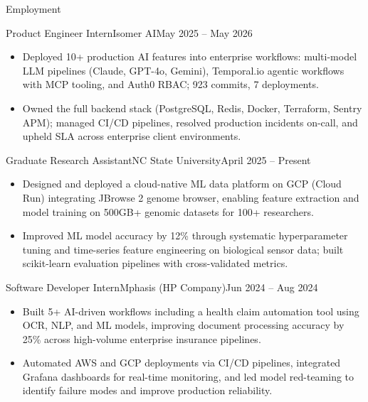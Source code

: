 \documentclass[]{mcdowellcv}
\begin{document}
\makeheader

\begin{cvsection}{Employment}
  \begin{cvsubsection}{Product Engineer Intern}{Isomer AI}{May 2025 -- May 2026}
    \begin{itemize}
      \item Deployed 10+ production AI features into enterprise workflows: multi-model LLM pipelines (Claude, GPT-4o, Gemini), Temporal.io agentic workflows with MCP tooling, and Auth0 RBAC; 923 commits, 7 deployments.
      \item Owned the full backend stack (PostgreSQL, Redis, Docker, Terraform, Sentry APM); managed CI/CD pipelines, resolved production incidents on-call, and upheld SLA across enterprise client environments.
    \end{itemize}
    \vspace{-1.5pt}
  \end{cvsubsection}

  \begin{cvsubsection}{Graduate Research Assistant}{NC State University}{April 2025 -- Present}
    \begin{itemize}
      \item Designed and deployed a cloud-native ML data platform on GCP (Cloud Run) integrating JBrowse 2 genome browser, enabling feature extraction and model training on 500GB+ genomic datasets for 100+ researchers.
      \item Improved ML model accuracy by 12\% through systematic hyperparameter tuning and time-series feature engineering on biological sensor data; built scikit-learn evaluation pipelines with cross-validated metrics.
    \end{itemize}
    \vspace{-1.5pt}
  \end{cvsubsection}

  \begin{cvsubsection}{Software Developer Intern}{Mphasis (HP Company)}{Jun 2024 -- Aug 2024}
    \begin{itemize}
      \item Built 5+ AI-driven workflows including a health claim automation tool using OCR, NLP, and ML models, improving document processing accuracy by 25\% across high-volume enterprise insurance pipelines.
      \item Automated AWS and GCP deployments via CI/CD pipelines, integrated Grafana dashboards for real-time monitoring, and led model red-teaming to identify failure modes and improve production reliability.
    \end{itemize}
    \vspace{-1.5pt}
  \end{cvsubsection}


\end{cvsection}
\end{document}
